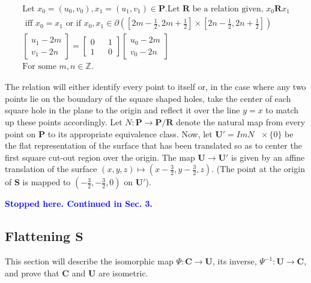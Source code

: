 \documentclass[]{article}
\newcommand{\compav}[1]{\textbf{\textcolor{blue}{#1}}}
\begin{document}
\begin{gather*}
\text{Let } x_{0}=(u_{0},v_{0}),x_{1}=(u_{1},v_{1}) \in \mathbf{P}. \text{Let } \mathbf{R} \text { be a relation given, } x_{0}\mathbf{R}x_{1} \\ \text{ iff } x_{0}=x_{1}
 \text{ or if }x_{0},x_{1} \in {\partial} \left( \left[2m-\frac{1}{2},2m+\frac{1}{2}\right] \times \left[2n-\frac{1}{2},2n+\frac{1}{2}\right] \right)\\
  \left[\begin{array}{c}
u_{1} -2m
\\v_{1}-2n
\end{array}\right] = \left[\begin{matrix}
0 && 1\\
1 && 0
\end{matrix}\right]
\left[ \begin{array}{c}u_{0}-2m\\
v_{0}-2n
\end{array}\right]
\\\text{For some }m,n\in\mathbb{Z}. \end{gather*}

The relation will either identify every point to itself or, in the case where any two points lie on the boundary of the square shaped holes, take the center of each square hole in the plane to the origin and reflect it over the line $y=x$ to match up these points accordingly.  Let $N: \mathbf{P} \rightarrow \mathbf{P}/\mathbf{R}$ denote the natural map from every point on $\mathbf{P}$ to its appropriate equivalence class. Now, let $\mathbf{U}' = Im N \text{ }\times\{0\}$ be the flat representation of the surface that has been translated so as to center the first square cut-out region over the origin. The map $\mathbf{U}\rightarrow\mathbf{U}'$ is given by an affine translation of the surface $(x,y,z) \mapsto (x-\frac{3}{2},y-\frac{3}{2},z)$. (The point at the origin of $\mathbf{S}$ is mapped to $(-\frac{3}{2},-\frac{3}{2},0) \text{ on } \mathbf{U}'$).

\compav{Stopped here. Continued in Sec. 3.}

\newpage
\subsection{Flattening $\mathbf{S}$}
This section will describe the isomorphic map $\Psi:\mathbf{C}\rightarrow\mathbf{U}$, its inverse, $\Psi^{-1}:\mathbf{U}\rightarrow\mathbf{C}$, and prove that $\mathbf{C}$ and $\mathbf{U}$ are isometric.
\end{document}
